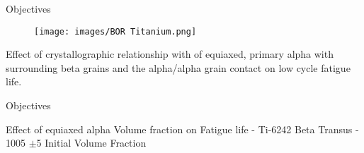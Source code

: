 \documentclass[10pt]{beamer}
\begin{document}

\begin{frame}[fragile]{Objectives}

\begin{figure}[H]
    \centering
        \texttt{[image: images/BOR Titanium.png]}
\end{figure}
Effect of crystallographic relationship with of equiaxed, primary alpha with surrounding beta grains and the alpha/alpha grain contact on low cycle fatigue life.

\iffalse
\begin{enumerate}
\item Study the effect of microstructure and microtexture on low cycle fatigue of Ti-6242 and Ti-6246 alloys.
\item Secondary alpha texture and its correlation with primary alpha texture.
\item First cycle slip analysis to determine initiation of slip.
\item Slip analysis after quarter-life or half-life to determine development of damage.
\item Fracture analysis.
\end{enumerate}
\fi

\end{frame}

{%
\begin{frame}[fragile]{Objectives}



\end{frame}
}


\begin{frame}[fragile]{Effect of equiaxed alpha Volume fraction on Fatigue life - Ti-6242}
Beta Transus - 1005 $\pm$5 \degC
Initial Volume Fraction 


\end{frame}


\end{document}
